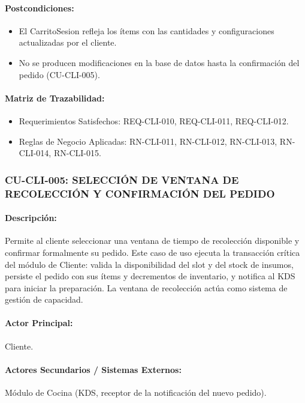\paragraph{Postcondiciones:}
\begin{itemize}
    \item El CarritoSesion refleja los ítems con las cantidades y configuraciones actualizadas por el cliente.
    \item No se producen modificaciones en la base de datos hasta la confirmación del pedido (CU-CLI-005).
\end{itemize}

\paragraph{Matriz de Trazabilidad:}
\begin{itemize}
    \item Requerimientos Satisfechos: REQ-CLI-010, REQ-CLI-011, REQ-CLI-012.
    \item Reglas de Negocio Aplicadas: RN-CLI-011, RN-CLI-012, RN-CLI-013, RN-CLI-014, RN-CLI-015.
\end{itemize}

\subsubsection{CU-CLI-005: SELECCIÓN DE VENTANA DE RECOLECCIÓN Y CONFIRMACIÓN DEL PEDIDO}
\paragraph{Descripción:} Permite al cliente seleccionar una ventana de tiempo de recolección disponible y confirmar formalmente su pedido. Este caso de uso ejecuta la transacción crítica del módulo de Cliente: valida la disponibilidad del slot y del stock de insumos, persiste el pedido con sus ítems y decrementos de inventario, y notifica al KDS para iniciar la preparación. La ventana de recolección actúa como sistema de gestión de capacidad.

\paragraph{Actor Principal:} Cliente.

\paragraph{Actores Secundarios / Sistemas Externos:} Módulo de Cocina (KDS, receptor de la notificación del nuevo pedido).

